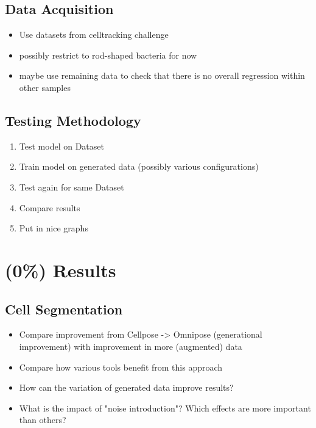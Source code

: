 \documentclass{article}
\begin{document}
\subsection{Data Acquisition}
\begin{itemize}
    \item Use datasets from celltracking challenge
    \item possibly restrict to rod-shaped bacteria for now
    \item maybe use remaining data to check that there is no overall regression within other samples
\end{itemize}
\subsection{Testing Methodology}
\begin{enumerate}
    \item Test model on Dataset
    \item Train model on generated data (possibly various configurations)
    \item Test again for same Dataset
    \item Compare results
    \item Put in nice graphs
\end{enumerate}

\section{(0\%) Results}
\subsection{Cell Segmentation}
\begin{itemize}
    \item Compare improvement from Cellpose -> Omnipose (generational improvement) with improvement
        in more (augmented) data
    \item Compare how various tools benefit from this approach
    \item How can the variation of generated data improve results?
    \item What is the impact of "noise introduction"? Which effects are more important than others?
\end{itemize}
\end{document}
